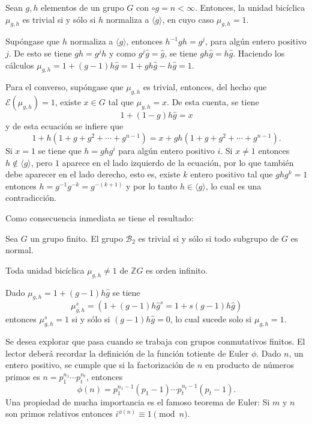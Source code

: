 \begin{proposicion}\label{prop:unidadesb}
Sean $g,h$ elementos de un grupo $G$ con $\circ g = n < \infty$. Entonces, la unidad bicíclica $\mu_{g,h}$ es trivial si y sólo si $h$ normaliza a $\langle g \rangle$, en cuyo caso $\mu_{g,h} = 1$.
\end{proposicion}
\begin{proof*}
Supóngase que $h$ normaliza a $\langle g \rangle$, entonces $h^{-1}gh = g^j$, para algún entero positivo $j$. De esto se tiene $gh = g^jh$ y como $g^j\hat{g} = \hat{g}$, se tiene $gh\hat{g} = h\hat{g}$. Haciendo los cálculos $\mu_{g,h} = 1+(g-1)h\hat{g}= 1+gh\hat{g}-h\hat{g} =1$.

Para el converso, supóngase que $\mu_{g,h}$ es trivial, entonces, del hecho que $\mathcal{E}(\mu_{g,h})=1$, existe $x \in G$ tal que $\mu_{g,h}=x$. De esta cuenta, se tiene
\[ 1+(1-g)h\hat{g} = x \] y de esta ecuación se infiere que \[ 1+ h(1+g+g^2+\cdots + g^{n-1}) = x +gh(1+g+g^2+\cdots+g^{n-1}).  \] Si $x=1$ se tiene que $h=ghg^i$ para algún entero positivo $i$. Si $x \neq 1$ entonces $h \notin \langle g \rangle$, pero $1$ aparece en el lado izquierdo de la ecuación, por lo que también debe aparecer en el lado derecho, esto es, existe $k$ entero positivo tal que $ghg^k = 1$ entonces $h = g^{-1}g^{-k}= g^{-(k+1)}$ y por lo tanto $h \in \langle g \rangle$, lo cual es una contradicción. 
\end{proof*}
Como consecuencia inmediata se tiene el resultado:
\begin{proposicion}
Sea $G$ un grupo finito. El grupo $\mathcal{B}_2$ es trivial si y sólo si todo subgrupo de $G$ es normal.
\end{proposicion}
\begin{proposicion}
Toda unidad bicíclica $\mu_{g,h} \neq 1$ de $\mathds{Z}G$ es orden infinito. 
\end{proposicion}
\begin{proof*}
Dado $\mu_{g,h} = 1 +(g-1)h\hat{g}$ se tiene
\[  \mu_{g,h}^s = (1+(g-1)h\hat{g}^s = 1+s(g-1)h\hat{g})  \] entonces $\mu_{g,h}^s = 1$ si y sólo si $(g-1)h\hat{g} = 0$, lo cual sucede solo si $\mu_{g,h} = 1$.
\end{proof*}
Se desea explorar que pasa cuando se trabaja con grupos conmutativos finitos. El lector deberá recordar la definición de la función totiente de Euler $\phi$. 
Dado $n$, un entero positivo, se cumple que si la factorización de $n$ en producto de números primos es $n = p_1^{n_1}\cdots p_t^{n_t}$, entonces \[ \phi(n) = p_1^{n_1-1}(p_1-1)\cdots p_t^{n_t-1}(p_t-1).  \] Una propiedad de mucha importancia es el famoso teorema de Euler: Si $m$ y $n$ son primos relativos entonces $i^{\phi(n)} \equiv 1 \pmod{n}.$
